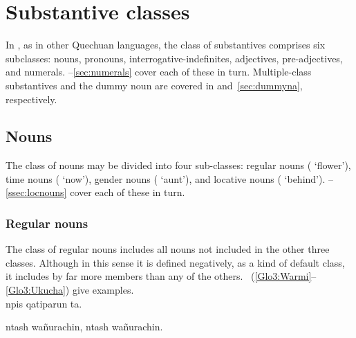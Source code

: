 \section{Substantive classes}
In \SYQ, as in other Quechuan languages, the class of substantives comprises six subclasses: nouns, pronouns, interrogative-indefinites, adjectives, pre-adjectives, and numerals. --\ref{sec:numerals} cover each of these in turn. Multiple-class substantives and the dummy noun  are covered in  and~\ref{sec:dummyna}, respectively.

\subsection{Nouns}\label{sec:nouns}
The class of nouns may be divided into four sub-classes: regular nouns ( ‘flower’), time nouns ( ‘now’), gender nouns ( ‘aunt’), and locative nouns ( ‘behind’). --\ref{ssec:locnouns} cover each of these in turn.

\subsubsection{Regular nouns}\label{ssec:regnouns}
The class of regular nouns includes all nouns not included in the other three classes. Although in this sense it is defined negatively, as a kind of default class, it includes by far more members than any of the others. ~(\ref{Glo3:Warmi}--\ref{Glo3:Ukucha}) give examples.\\

%
{npis qatiparun ta.}%
{}%
{}{}%

%
{ntash wañurachin, ntash wañurachin.}%
{}%
{}{}%


